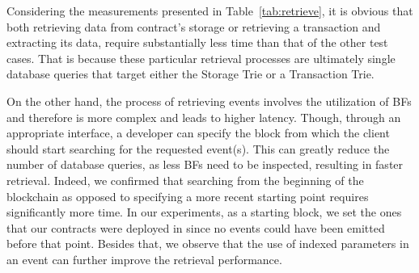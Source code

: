Considering the measurements presented in Table~\ref{tab:retrieve}, it is obvious that both retrieving data from contract’s storage or retrieving a transaction and extracting its data, require substantially less time than that of the other test cases. That is because these particular retrieval processes are ultimately single database queries that target either the Storage Trie or a Transaction Trie. 

\begin{table}[]
\caption{Retrieval latency in Ethereum (ms)}
\label{tab:retrieve}
\end{table}

On the other hand, the process of retrieving events involves the utilization of BFs and therefore is more complex and leads to higher latency. Though, through an appropriate interface, a developer can specify the block from which the client should start searching for the requested event(s). This can greatly reduce the number of database queries, as less BFs need to be inspected, resulting in faster retrieval. Indeed, we confirmed that searching from the beginning of the blockchain as opposed to specifying a more recent starting point requires significantly more time. In our experiments, as a starting block, we set the ones that our contracts were deployed in since no events could have been emitted before that point. Besides that, we observe that the use of indexed parameters in an event can further improve the retrieval performance.

